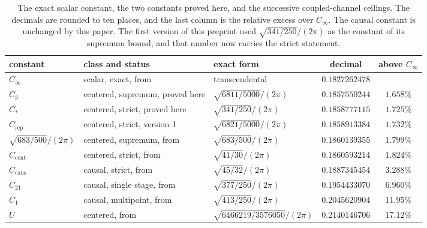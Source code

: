 \documentclass[10pt]{article}
\theoremstyle{remark}
\newcommand{\Cinf}{C_\infty}
\newcommand{\Ccent}{C_{\mathrm{cent}}}
\newcommand{\Ccaus}{C_{\mathrm{caus}}}
\newcommand{\Cstar}{C_{*}}
\newcommand{\Cthree}{C_{3}}
\newcommand{\Crep}{C_{\mathrm{rep}}}
\begin{document}
\begin{table}[t]
\centering
\small
\setlength{\tabcolsep}{4pt}
\begin{tabular}{@{}lllcc@{}}
\hline
constant & class and status & exact form & decimal & above $\Cinf$ \\
\hline
$\Cinf$ & scalar, exact, from~\cite{finite} & transcendental & $0.1827262478$ & \\
$\Cthree$ & centered, supremum, proved here & $\sqrt{6811/5000}/(2\pi)$ & $0.1857550244$ & $1.658\%$ \\
$\Cstar$ & centered, strict, proved here & $\sqrt{341/250}/(2\pi)$ & $0.1858777115$ & $1.725\%$ \\
$\Crep$ & centered, strict, version 1 & $\sqrt{6821/5000}/(2\pi)$ & $0.1858913384$ & $1.732\%$ \\
$\sqrt{683/500}/(2\pi)$ & centered, supremum, from~\cite{finiteenergy} & $\sqrt{683/500}/(2\pi)$ & $0.1860139355$ & $1.799\%$ \\
$\Ccent$ & centered, strict, from~\cite{finiteenergy} & $\sqrt{41/30}/(2\pi)$ & $0.1860593214$ & $1.824\%$ \\
$\Ccaus$ & causal, strict, from~\cite{finiteenergy} & $\sqrt{45/32}/(2\pi)$ & $0.1887345454$ & $3.288\%$ \\
$C_{21}$ & causal, single stage, from~\cite{optimum} & $\sqrt{377/250}/(2\pi)$ & $0.1954433070$ & $6.960\%$ \\
$C_1$ & causal, multipoint, from~\cite{optimum} & $\sqrt{413/250}/(2\pi)$ & $0.2045620904$ & $11.95\%$ \\
$U$ & centered, from~\cite{predecessor} & $\sqrt{6466219/3576050}/(2\pi)$ & $0.2140146706$ & $17.12\%$ \\
\hline
\end{tabular}
\caption{The exact scalar constant, the two constants proved here, and the successive coupled-channel ceilings. The decimals are rounded to ten places, and the last column is the relative excess over $\Cinf$. The causal constant is unchanged by this paper. The first version of this preprint used $\sqrt{341/250}/(2\pi)$ as the constant of its supremum bound, and that number now carries the strict statement.}\label{tab:constants}
\end{table}
\end{document}
